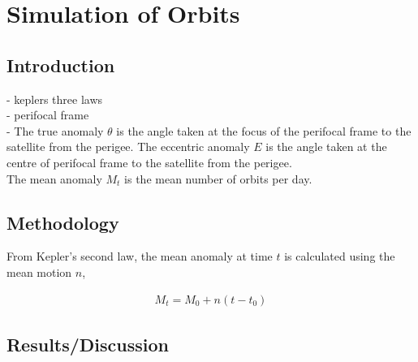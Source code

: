 \documentclass[Space3_Assign1.tex]{subfiles}
\begin{document}
\section{Simulation of Orbits}
\subsection{Introduction}
- keplers three laws\\
- perifocal frame\\
- The true anomaly $\theta$ is the angle taken at the focus of the perifocal frame to the satellite from the perigee. The eccentric anomaly $\textit{E}$ is the angle taken at the centre of perifocal frame to the satellite from the perigee.\\
The mean anomaly \textit{$M_t$} is the mean number of orbits per day.

\subsection{Methodology}
From Kepler's second law, the mean anomaly at time $\textit{t}$ is calculated using the mean motion $\textit{n}$, 

\begin{eqnarray}
M_t = M_0 + n(t-t_0)
\end{eqnarray}

\subsection{Results/Discussion}
\end{document}
